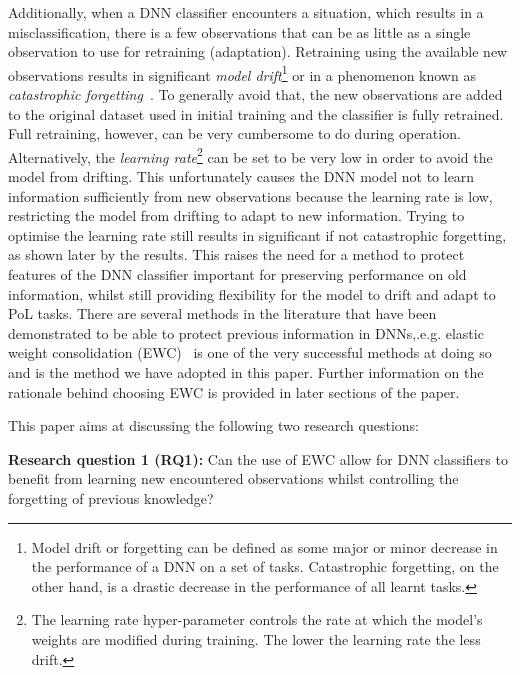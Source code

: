     Additionally, when a DNN classifier encounters a situation, which results in a misclassification, there is a few observations that can be as little as a single observation to use for retraining (adaptation). 
    Retraining using the available new observations results in significant \textit{model drift}\footnote{Model drift or forgetting can be defined as some major or minor decrease in the performance of a DNN on a set of tasks. Catastrophic forgetting, on the other hand, is a drastic decrease in the performance of all learnt tasks.} or in a phenomenon known as \textit{catastrophic forgetting}~\cite{Goodfellow2014}. 
    To generally avoid that, the new observations are added to the original dataset used in initial training and the classifier is fully retrained. 
    Full retraining, however, can be very cumbersome to do during operation. 
    Alternatively, the \textit{learning rate}\footnote{The learning rate hyper-parameter controls the rate at which the model's weights are modified during training.
    The lower the learning rate the less drift.} 
    can be set to be very low in order to avoid the model from drifting. 
    This unfortunately causes the DNN model not to learn information sufficiently from new observations because the learning rate is low, restricting the model from drifting to adapt to new information. 
    Trying to optimise the learning rate still results in significant if not catastrophic forgetting, as shown later by the results. 
    This raises the need for a method to protect features of the DNN classifier important for preserving performance on old information, whilst still providing flexibility for the model to drift and adapt to PoL tasks.
    There are several methods in the literature that have been demonstrated to be able to protect previous information in DNNs,.e.g. elastic weight consolidation (EWC)~\cite{Kirkpatrick2017} is one of the very successful methods at doing so and is the method we have adopted in this paper. 
    Further information on the rationale behind choosing EWC is provided in later sections of the paper.
    

This paper aims at discussing the following two research questions:

\textbf{Research question 1 (RQ1):} Can the use of EWC allow for DNN classifiers to benefit from learning new encountered observations whilst controlling the forgetting of previous knowledge?

